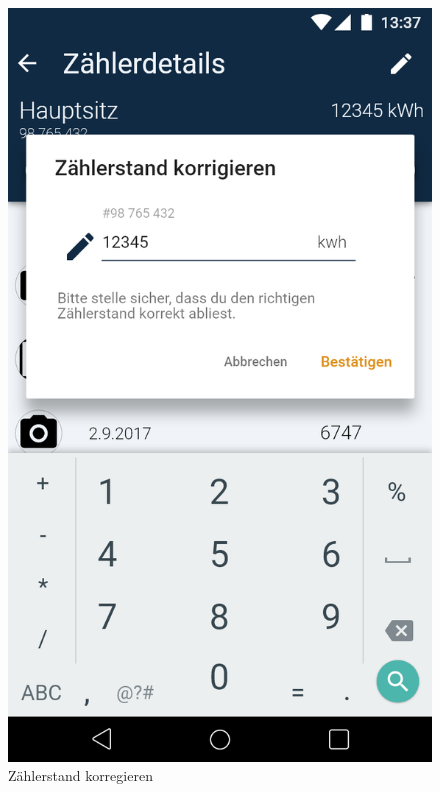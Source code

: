 \begin{figure}[h]
	\includegraphics[scale = 0.22]{img/AndroidMockup/correct}		
	\caption{Zählerstand korregieren}
	\label{fig:mock-pw}
\end{figure}

